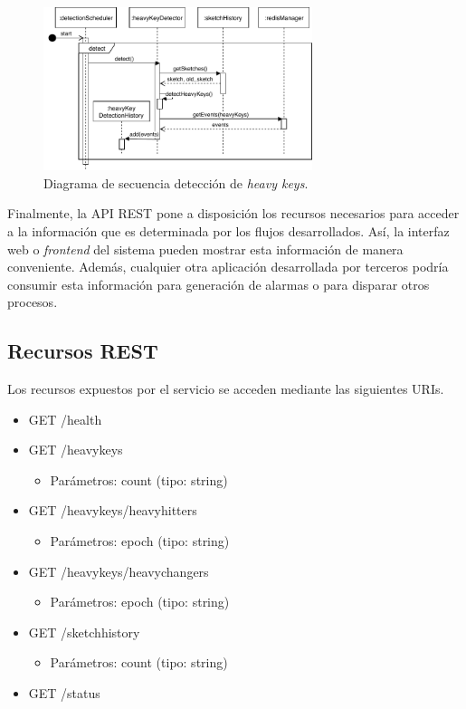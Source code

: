 \documentclass[a4paper,10pt, oneside]{article}
\begin{document}
\begin{figure}[h]
\centering
\includegraphics[width=0.7\textwidth]{./graph/SecDiag-detectionSchedulerDetect.pdf}
\caption{Diagrama de secuencia detección de \textit{heavy keys}.}
\label{diag:hk_detection}
\end{figure}

Finalmente, la API REST pone a disposición los recursos necesarios para acceder a la información que es determinada por los flujos desarrollados. Así, la interfaz web o \textit{frontend} del sistema pueden mostrar esta información de manera conveniente. Además, cualquier otra aplicación desarrollada por terceros podría consumir esta información para generación de alarmas o para disparar otros procesos.

\subsection{Recursos REST}
Los recursos expuestos por el servicio se acceden mediante las siguientes URIs.

\begin{itemize}
	\item GET     /health
	\item GET     /heavykeys
	\begin{itemize}
		\item Parámetros: count (tipo: string)
	\end{itemize}
	\item GET     /heavykeys/heavyhitters
	\begin{itemize}
		\item Parámetros: epoch (tipo: string)
	\end{itemize}
	\item GET     /heavykeys/heavychangers
	\begin{itemize}
		\item Parámetros: epoch (tipo: string)
	\end{itemize}
	\item GET     /sketchhistory
	\begin{itemize}
		\item Parámetros: count (tipo: string)
	\end{itemize}
	\item GET     /status
\end{itemize}
\end{document}
